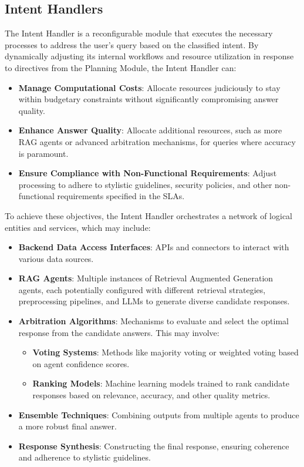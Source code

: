 \documentclass[sigconf,nonacm]{acmart}
\begin{document}
\subsection{Intent Handlers}

The Intent Handler is a reconfigurable module that executes the necessary processes to address the user's query based on the classified intent. By dynamically adjusting its internal workflows and resource utilization in response to directives from the Planning Module, the Intent Handler can:

\begin{itemize}
    \item \textbf{Manage Computational Costs}: Allocate resources judiciously to stay within budgetary constraints without significantly compromising answer quality.
    \item \textbf{Enhance Answer Quality}: Allocate additional resources, such as more RAG agents or advanced arbitration mechanisms, for queries where accuracy is paramount.
    \item \textbf{Ensure Compliance with Non-Functional Requirements}: Adjust processing to adhere to stylistic guidelines, security policies, and other non-functional requirements specified in the SLAs.
\end{itemize}

To achieve these objectives, the Intent Handler orchestrates a network of logical entities and services, which may include:

\begin{itemize}
    \item \textbf{Backend Data Access Interfaces}: APIs and connectors to interact with various data sources.
    \item \textbf{RAG Agents}: Multiple instances of Retrieval Augmented Generation agents, each potentially configured with different retrieval strategies, preprocessing pipelines, and LLMs to generate diverse candidate responses.
    \item \textbf{Arbitration Algorithms}: Mechanisms to evaluate and select the optimal response from the candidate answers. This may involve:
    \begin{itemize}
        \item \textbf{Voting Systems}: Methods like majority voting or weighted voting based on agent confidence scores.
        \item \textbf{Ranking Models}: Machine learning models trained to rank candidate responses based on relevance, accuracy, and other quality metrics.
    \end{itemize}
    \item \textbf{Ensemble Techniques}: Combining outputs from multiple agents to produce a more robust final answer.
    \item \textbf{Response Synthesis}: Constructing the final response, ensuring coherence and adherence to stylistic guidelines.
\end{itemize}
\end{document}
